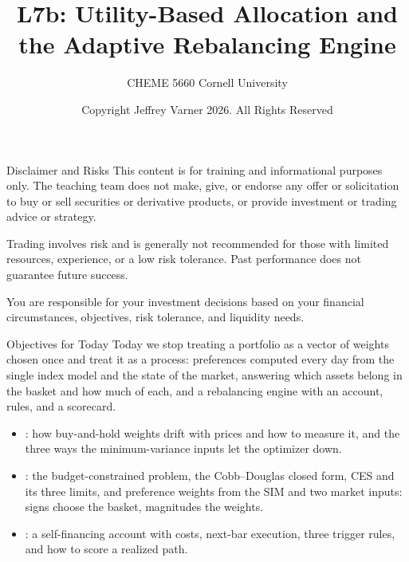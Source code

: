 \documentclass[aspectratio=169,11pt]{beamer}
\title{\texorpdfstring{{\vnheavy L7b}}{L7b}: Utility-Based Allocation and the Adaptive Rebalancing Engine}
\subtitle{CHEME 5660 Cornell University}
\author{Copyright Jeffrey Varner 2026. All Rights Reserved}
\begin{document}
\vntitlepage

\begin{frame}{Disclaimer and Risks}
  \vspace{0.6em}
  \textbf{} This content is for training and informational
  purposes only. The teaching team does not make, give, or endorse any offer or
  solicitation to buy or sell securities or derivative products, or provide
  investment or trading advice or strategy.

  \vspace{1.1em}
  \textbf{} Trading involves risk and is generally not recommended for
  those with limited resources, experience, or a low risk tolerance. Past
  performance does not guarantee future success.

  \vspace{1.1em}
  \textbf{} You are responsible for your investment decisions
  based on your financial circumstances, objectives, risk tolerance, and
  liquidity needs.
\end{frame}

\begin{frame}{Objectives for Today}
  Today we stop treating a portfolio as a vector of weights chosen once and treat
  it as a process: preferences computed every day from the single index model and
  the state of the market, answering which assets belong in the basket and how
  much of each, and a rebalancing engine with an account, rules, and a scorecard.

  \vspace{0.6em}
  {\large\textbf{}}
  \vspace{0.2em}
  \begin{itemize}\setlength{\itemsep}{0.45em}
    \item {}: how buy-and-hold weights drift
      with prices and how to measure it, and the three ways the minimum-variance
      inputs let the optimizer down.
    \item {}: the budget-constrained problem, the
      Cobb--Douglas closed form, CES and its three limits, and preference weights
      from the SIM and two market inputs: signs choose the basket, magnitudes the
      weights.
    \item {}: a self-financing account with costs,
      next-bar execution, three trigger rules, and how to score a realized path.
  \end{itemize}
\end{frame}
\end{document}
